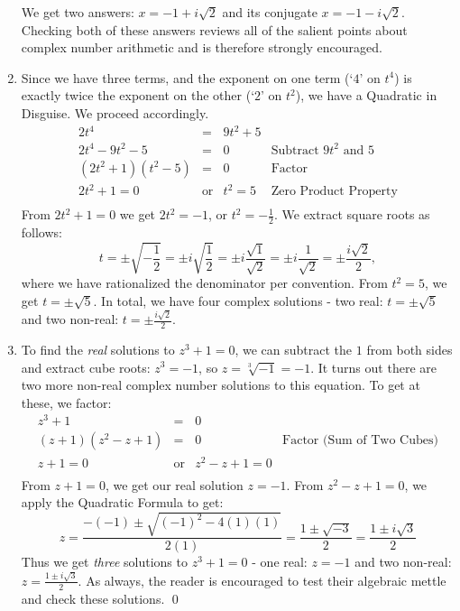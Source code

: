 \documentclass{ximera}
\begin{document}
\begin{ex}
\begin{enumerate}
We get two answers: $x = -1 + i\sqrt{2}$ and its conjugate $x = -1 - i\sqrt{2}$.  Checking both of these answers reviews all of the salient points about complex number arithmetic and is therefore strongly encouraged.

\item  Since we have three terms, and the exponent on one term (`$4$' on $t^4$) is exactly twice the exponent on the other (`$2$' on $t^2$), we have a Quadratic in Disguise.  We proceed accordingly.\[ \begin{array}{rclr}

2t^4 & = & 9t^2 + 5 & \\

2t^4 - 9t^2 - 5 & = & 0 & \text{Subtract $9t^2$ and $5$} \\
(2t^2 + 1)(t^2 - 5) & = & 0 & \text{Factor} \\
2t^2 + 1 = 0 & \text{or} & t^2 = 5 & \text{Zero Product Property} \\
\end{array}\]  From $2t^2 + 1 = 0$ we get $2t^2 = -1$, or $t^2 = -\frac{1}{2}$.  We extract square roots as follows: \[ t = \pm \sqrt{-\dfrac{1}{2}} = \pm i \sqrt{\dfrac{1}{2}} = \pm i \dfrac{\sqrt{1}}{\sqrt{2}} = \pm i \dfrac{1}{\sqrt{2}} = \pm \dfrac{i \sqrt{2}}{2},\]
where we have rationalized the denominator per convention.  From $t^2 = 5$, we get $t = \pm \sqrt{5}$. In total, we have four complex solutions - two real: $t = \pm \sqrt{5}$ and two non-real: $t = \pm \frac{i \sqrt{2}}{2}$.

\item To find  the \textit{real} solutions to  $z^3 + 1 = 0$, we can subtract the $1$ from both sides and extract cube roots: $z^3 = -1$, so $z  = \sqrt[3]{-1} = -1$.  It turns out there are two more non-real complex number solutions to this equation.  To get at these, we factor:\[ \begin{array}{rclr}

z ^ 3 + 1 & = & 0 & \\
(z + 1)(z^2 - z + 1) & = & 0 & \text{Factor (Sum of Two Cubes)} \\
z + 1 = 0 & \text{or} & z^2 - z + 1 = 0 & \\
\end{array} \] From $z+1 = 0$, we get our real solution $z = -1$.  From $z^2 -z + 1 = 0$, we apply the Quadratic Formula to get: \[z = \dfrac{-(-1) \pm \sqrt{(-1)^2 - 4(1)(1)}}{2(1)} = \dfrac{1 \pm \sqrt{-3}}{2} = \dfrac{1 \pm i\sqrt{3}}{2} \]
Thus we get \textit{three} solutions to $z^3 + 1 = 0$ - one real: $z = -1$ and two non-real: $z =  \frac{1 \pm i\sqrt{3}}{2}$.  As always, the reader is encouraged to test their algebraic mettle and check these solutions. \qed
		
\end{enumerate}


\end{ex}
\end{document}
